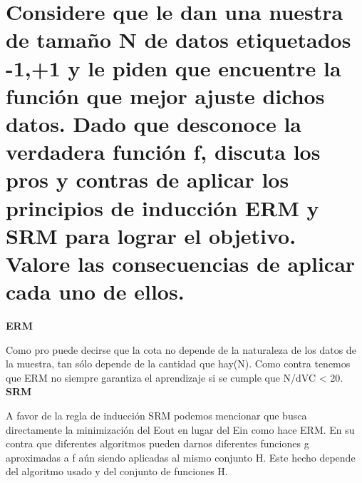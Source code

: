 \newpage
\section{Considere que le dan una nuestra de tamaño N de datos etiquetados {-1,+1} y le piden que encuentre la función que mejor ajuste dichos datos. Dado que desconoce la verdadera función f, discuta los pros y contras de aplicar los principios de inducción ERM y SRM para lograr el objetivo. Valore las consecuencias de aplicar cada uno de ellos.
}



\textbf{ERM}

Como pro puede decirse que la cota no depende de la naturaleza de los datos de la muestra, tan sólo depende de la cantidad que hay(N). Como contra tenemos que ERM no siempre garantiza el aprendizaje si se cumple que N/dVC < 20. \\

\textbf{SRM}

A favor de la regla de inducción SRM podemos mencionar que busca directamente la minimización del Eout en lugar del Ein como hace ERM. En su contra que diferentes algoritmos pueden darnos diferentes funciones g aproximadas a f aún siendo aplicadas al mismo conjunto H. Este hecho depende del algoritmo usado y del conjunto de funciones H.
\newpage








\newpage






